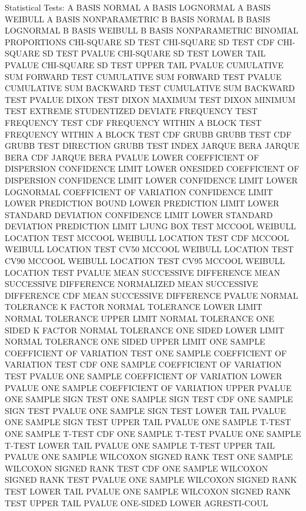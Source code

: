 Statistical Tests:
   A BASIS NORMAL
   A BASIS LOGNORMAL
   A BASIS WEIBULL
   A BASIS NONPARAMETRIC
   B BASIS NORMAL
   B BASIS LOGNORMAL
   B BASIS WEIBULL
   B BASIS NONPARAMETRIC
   BINOMIAL PROPORTIONS
   CHI-SQUARE SD TEST
   CHI-SQUARE SD TEST CDF
   CHI-SQUARE SD TEST PVALUE
   CHI-SQUARE SD TEST LOWER TAIL PVALUE
   CHI-SQUARE SD TEST UPPER TAIL PVALUE
   CUMULATIVE SUM FORWARD TEST
   CUMULATIVE SUM FORWARD TEST PVALUE
   CUMULATIVE SUM BACKWARD TEST
   CUMULATIVE SUM BACKWARD TEST PVALUE
   DIXON TEST
   DIXON MAXIMUM TEST
   DIXON MINIMUM TEST
   EXTREME STUDENTIZED DEVIATE
   FREQUENCY TEST
   FREQUENCY TEST CDF
   FREQUENCY WITHIN A BLOCK TEST
   FREQUENCY WITHIN A BLOCK TEST CDF
   GRUBB 
   GRUBB TEST CDF
   GRUBB TEST DIRECTION
   GRUBB TEST INDEX
   JARQUE BERA
   JARQUE BERA CDF
   JARQUE BERA PVALUE
   LOWER COEFFICIENT OF DISPERSION CONFIDENCE LIMIT
   LOWER ONESIDED COEFFICIENT OF DISPERSION CONFIDENCE LIMIT
   LOWER CONFIDENCE LIMIT
   LOWER LOGNORMAL COEFFICIENT OF VARIATION CONFIDENCE LIMIT
   LOWER PREDICTION BOUND
   LOWER PREDICTION LIMIT
   LOWER STANDARD DEVIATION CONFIDENCE LIMIT
   LOWER STANDARD DEVIATION PREDICTION LIMIT
   LJUNG BOX TEST
   MCCOOL WEIBULL LOCATION TEST
   MCCOOL WEIBULL LOCATION TEST CDF
   MCCOOL WEIBULL LOCATION TEST CV50
   MCCOOL WEIBULL LOCATION TEST CV90
   MCCOOL WEIBULL LOCATION TEST CV95
   MCCOOL WEIBULL LOCATION TEST PVALUE
   MEAN SUCCESSIVE DIFFERENCE
   MEAN SUCCESSIVE DIFFERENCE NORMALIZED
   MEAN SUCCESSIVE DIFFERENCE CDF
   MEAN SUCCESSIVE DIFFERENCE PVALUE
   NORMAL TOLERANCE K FACTOR
   NORMAL TOLERANCE LOWER LIMIT
   NORMAL TOLERANCE UPPER LIMIT
   NORMAL TOLERANCE ONE SIDED K FACTOR
   NORMAL TOLERANCE ONE SIDED LOWER LIMIT
   NORMAL TOLERANCE ONE SIDED UPPER LIMIT
   ONE SAMPLE COEFFICIENT OF VARIATION TEST
   ONE SAMPLE COEFFICIENT OF VARIATION TEST CDF
   ONE SAMPLE COEFFICIENT OF VARIATION TEST PVALUE
   ONE SAMPLE COEFFICIENT OF VARIATION LOWER PVALUE
   ONE SAMPLE COEFFICIENT OF VARIATION UPPER PVALUE
   ONE SAMPLE SIGN TEST
   ONE SAMPLE SIGN TEST CDF
   ONE SAMPLE SIGN TEST PVALUE
   ONE SAMPLE SIGN TEST LOWER TAIL PVALUE
   ONE SAMPLE SIGN TEST UPPER TAIL PVALUE
   ONE SAMPLE T-TEST
   ONE SAMPLE T-TEST CDF
   ONE SAMPLE T-TEST PVALUE
   ONE SAMPLE T-TEST LOWER TAIL PVALUE
   ONE SAMPLE T-TEST UPPER TAIL PVALUE
   ONE SAMPLE WILCOXON SIGNED RANK TEST
   ONE SAMPLE WILCOXON SIGNED RANK TEST CDF
   ONE SAMPLE WILCOXON SIGNED RANK TEST PVALUE
   ONE SAMPLE WILCOXON SIGNED RANK TEST LOWER TAIL PVALUE
   ONE SAMPLE WILCOXON SIGNED RANK TEST UPPER TAIL PVALUE
   ONE-SIDED LOWER AGRESTI-COUL
